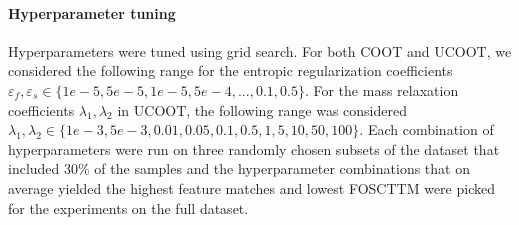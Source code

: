 
\paragraph{Hyperparameter tuning} Hyperparameters were tuned using grid search.
For both COOT and UCOOT, we considered the following range for the entropic regularization
coefficients $\varepsilon_f, \varepsilon_s \in \{1e-5, 5e-5, 1e-5, 5e-4, ... ,0.1, 0.5\}$.
For the mass relaxation coefficients $\lambda_1, \lambda_2 $ in UCOOT, the following range
was considered $\lambda_1, \lambda_2 \in \{1e-3, 5e-3, 0.01, 0.05, 0.1, 0.5, 1, 5, 10, 50 ,100\}$.
Each combination of hyperparameters were run on three randomly chosen subsets of the dataset
that included 30\% of the samples and the hyperparameter combinations that on average yielded
the highest feature matches and lowest FOSCTTM were picked for the experiments on the full dataset.


